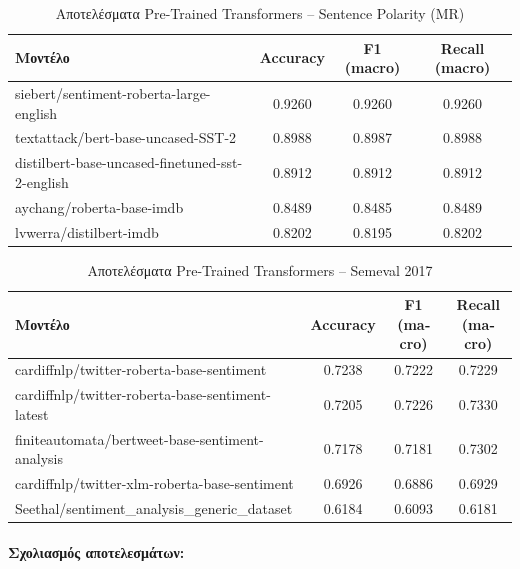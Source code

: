 \documentclass[11pt,a4paper]{article}
\begin{document}
\begin{table}[H]
  \centering
  \caption{Αποτελέσματα \textlatin{Pre-Trained Transformers} -- \textlatin{Sentence Polarity (MR)}}
  \begin{tabular}{lccc}
    \toprule
    \textbf{Μοντέλο} & \textbf{\textlatin{Accuracy}} & \textbf{\textlatin{F1 (macro)}} & \textbf{\textlatin{Recall (macro)}} \\
    \midrule
    \textlatin{siebert/sentiment-roberta-large-english}           & 0.9260 & 0.9260 & 0.9260 \\
    \textlatin{textattack/bert-base-uncased-SST-2}                & 0.8988 & 0.8987 & 0.8988 \\
    \textlatin{distilbert-base-uncased-finetuned-sst-2-english}   & 0.8912 & 0.8912 & 0.8912 \\
    \textlatin{aychang/roberta-base-imdb}                         & 0.8489 & 0.8485 & 0.8489 \\
    \textlatin{lvwerra/distilbert-imdb}                           & 0.8202 & 0.8195 & 0.8202 \\
    \bottomrule
  \end{tabular}
\end{table}

\begin{table}[H]
  \centering
  \caption{Αποτελέσματα \textlatin{Pre-Trained Transformers} -- \textlatin{Semeval 2017}}
  \begin{tabular}{lccc}
    \toprule
    \textbf{Μοντέλο} & \textbf{\textlatin{Accuracy}} & \textbf{\textlatin{F1 (macro)}} & \textbf{\textlatin{Recall (macro)}} \\
    \midrule
    \textlatin{cardiffnlp/twitter-roberta-base-sentiment}         & 0.7238 & 0.7222 & 0.7229 \\
    \textlatin{cardiffnlp/twitter-roberta-base-sentiment-latest}  & 0.7205 & 0.7226 & 0.7330 \\
    \textlatin{finiteautomata/bertweet-base-sentiment-analysis}   & 0.7178 & 0.7181 & 0.7302 \\
    \textlatin{cardiffnlp/twitter-xlm-roberta-base-sentiment}     & 0.6926 & 0.6886 & 0.6929 \\
    \textlatin{Seethal/sentiment\_analysis\_generic\_dataset}     & 0.6184 & 0.6093 & 0.6181 \\
    \bottomrule
  \end{tabular}
\end{table}

\paragraph{Σχολιασμός αποτελεσμάτων:}
\end{document}
